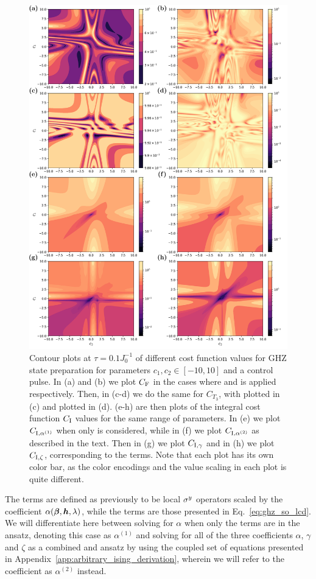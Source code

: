 \begin{figure}[t!]
    \centering
    \includegraphics[width=0.75\linewidth]{images/ghz_contour_integrals.png} \caption[Contour plots of cost function landscapes for GHZ state preparation in frustrated spin systems (integral cost function).]{Contour plots at $\tau = 0.1 J_0^{-1}$ of different cost function values for GHZ state preparation for parameters $c_1, c_2 \in [-10,10]$ and a  control pulse. In (a) and (b) we plot $C_{\rm F}$ in the cases where  and   is applied respectively. Then, in (c-d) we do the same for $C_{T_3}$, with   plotted in (c) and   plotted in (d). (e-h) are then plots of the integral cost function $C_{\rm I}$ values for the same range of parameters. In (e) we plot $C_{\rm I, \alpha^{(1)}}$ when only   is considered, while in (f) we plot $C_{\rm I, \alpha^{(2)}}$ as described in the text. Then in (g) we plot $C_{\rm I, \gamma}$ and in (h) we plot $C_{\rm I, \zeta}$, corresponding to the  terms. Note that each plot has its own color bar, as the color encodings and the value scaling in each plot is quite different.}\label{fig:ghz_contours}
\end{figure}

The   terms are defined as previously to be local $\sigma^y$ operators scaled by the coefficient $\alpha(\boldsymbol{\beta}, \boldsymbol{h}, \lambda)$, while the  terms are those presented in Eq.~\eqref{eq:ghz_so_lcd}. We will differentiate here between solving for $\alpha$ when only the  terms are in the  ansatz, denoting this case as $\alpha^{(1)}$ and solving for all of the three coefficients $\alpha$, $\gamma$ and $\zeta$ as a combined  and  ansatz by using the coupled set of equations presented in Appendix~\ref{app:arbitrary_ising_derivation}, wherein we will refer to the  coefficient as $\alpha^{(2)}$ instead.

